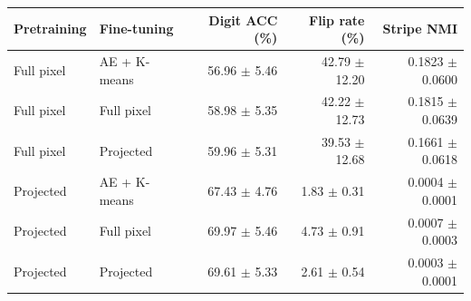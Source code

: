 \begin{tabular}{llrrr}
\toprule
Pretraining & Fine-tuning & Digit ACC (\%) & Flip rate (\%) & Stripe NMI\\
\midrule
Full pixel & AE + K-means & 56.96 $\pm$ 5.46 & 42.79 $\pm$ 12.20 & 0.1823 $\pm$ 0.0600\\
Full pixel & Full pixel & 58.98 $\pm$ 5.35 & 42.22 $\pm$ 12.73 & 0.1815 $\pm$ 0.0639\\
Full pixel & Projected & 59.96 $\pm$ 5.31 & 39.53 $\pm$ 12.68 & 0.1661 $\pm$ 0.0618\\
\addlinespace
Projected & AE + K-means & 67.43 $\pm$ 4.76 & 1.83 $\pm$ 0.31 & 0.0004 $\pm$ 0.0001\\
Projected & Full pixel & 69.97 $\pm$ 5.46 & 4.73 $\pm$ 0.91 & 0.0007 $\pm$ 0.0003\\
Projected & Projected & 69.61 $\pm$ 5.33 & 2.61 $\pm$ 0.54 & 0.0003 $\pm$ 0.0001\\
\bottomrule
\end{tabular}
